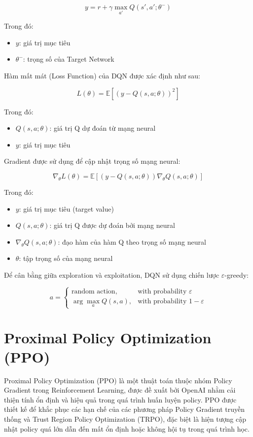 \[
y = r+\gamma \max_{a'}Q(s',a';\theta^{-})
\]

Trong đó:
\begin{itemize}
    \item $y$: giá trị mục tiêu
    \item $\theta^{-}$: trọng số của Target Network
\end{itemize}

Hàm mất mát (Loss Function) của DQN được xác định như sau:

\[
L(\theta)=\mathbb{E}\left[(y-Q(s,a;\theta))^2\right]
\]

Trong đó:
\begin{itemize}
    \item $Q(s,a;\theta)$: giá trị Q dự đoán từ mạng neural
    \item $y$: giá trị mục tiêu
\end{itemize}

Gradient được sử dụng để cập nhật trọng số mạng neural:

\[
\nabla_{\theta}L(\theta)=
\mathbb{E}\left[(y-Q(s,a;\theta))
\nabla_{\theta}Q(s,a;\theta)\right]
\]

Trong đó:
\begin{itemize}
    \item $y$: giá trị mục tiêu (target value)
    \item $Q(s,a;\theta)$: giá trị Q được dự đoán bởi mạng neural
    \item $\nabla_{\theta}Q(s,a;\theta)$: đạo hàm của hàm Q theo trọng số mạng neural
    \item $\theta$: tập trọng số của mạng neural
\end{itemize}

Để cân bằng giữa exploration và exploitation, DQN sử dụng chiến lược $\varepsilon$-greedy:

\[
a=
\begin{cases}
\text{random action}, & \text{with probability } \varepsilon \\
\arg\max_a Q(s,a), & \text{with probability } 1-\varepsilon
\end{cases}
\]



\section{Proximal Policy Optimization (PPO)}

Proximal Policy Optimization (PPO) là một thuật toán thuộc nhóm Policy Gradient trong Reinforcement Learning, được đề xuất bởi OpenAI nhằm cải thiện tính ổn định và hiệu quả trong quá trình huấn luyện policy. PPO được thiết kế để khắc phục các hạn chế của các phương pháp Policy Gradient truyền thống và Trust Region Policy Optimization (TRPO), đặc biệt là hiện tượng cập nhật policy quá lớn dẫn đến mất ổn định hoặc không hội tụ trong quá trình học.

